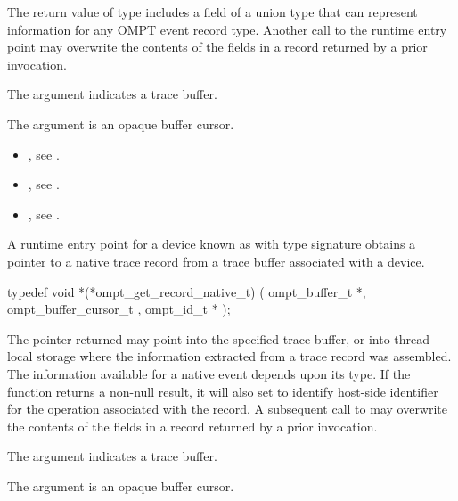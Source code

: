 The return value of type 
includes a field of a union type that can represent
information for any OMPT event record type.
Another call to the runtime entry point may overwrite the
contents of the fields in a record returned by a prior invocation.

\argdesc
The argument  indicates a trace buffer.

The argument  is an opaque buffer cursor.

\crossreferences
\begin{itemize}
\item {},
see .
\item {},
see .
\item {},
see .
\end{itemize}

\label{sec:ompt_get_record_native_t}

\summary

A runtime entry point for a device known as
 with type signature
obtains a pointer to a native trace record from a trace buffer associated with a device.

\format
\begin{ccppspecific}
\begin{omptInquiry}
typedef void *(*ompt_get_record_native_t) (
  ompt_buffer_t *,
  ompt_buffer_cursor_t ,
  ompt_id_t *
);
\end{omptInquiry}
\end{ccppspecific}

\descr

The pointer returned  may point into the specified trace buffer, or into
thread local storage where the information extracted from a trace
record was assembled. The information available for a native event
depends upon its type. If the function returns a non-null result,
it will also set  to identify host-side identifier
for the operation associated with the record.  A subsequent call
to  may overwrite the
contents of the fields in a record returned by a prior invocation.

\argdesc
The argument  indicates a trace buffer.

The argument  is an opaque buffer cursor.


